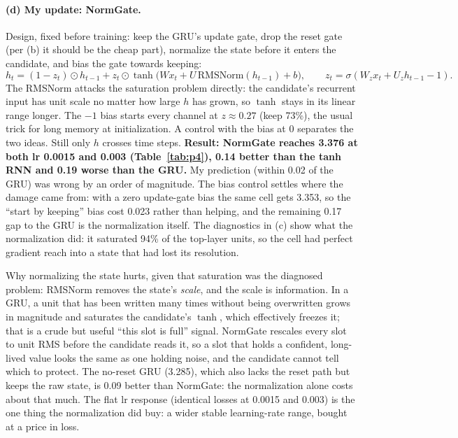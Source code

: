 \paragraph{(d) My update: NormGate.} Design, fixed before training: keep the GRU's update gate, drop the reset gate (per (b) it should be the cheap part), normalize the state before it enters the candidate, and bias the gate towards keeping:
\[ h_t = (1-z_t)\odot h_{t-1} + z_t\odot\tanh\big(W x_t + U\,\mathrm{RMSNorm}(h_{t-1}) + b\big),\qquad z_t=\sigma(W_z x_t+U_z h_{t-1} - 1). \]
The RMSNorm attacks the saturation problem directly: the candidate's recurrent input has unit scale no matter how large $h$ has grown, so $\tanh$ stays in its linear range longer. The $-1$ bias starts every channel at $z\approx 0.27$ (keep 73\%), the usual trick for long memory at initialization. A control with the bias at 0 separates the two ideas. Still only $h$ crosses time steps.
\textbf{Result: NormGate reaches 3.376 at both lr 0.0015 and 0.003 (Table~\ref{tab:p4}), 0.14 better than the tanh RNN and 0.19 worse than the GRU.} My prediction (within 0.02 of the GRU) was wrong by an order of magnitude. The bias control settles where the damage came from: with a zero update-gate bias the same cell gets 3.353, so the ``start by keeping'' bias cost 0.023 rather than helping, and the remaining 0.17 gap to the GRU is the normalization itself. The diagnostics in (c) show what the normalization did: it saturated 94\% of the top-layer units, so the cell had perfect gradient reach into a state that had lost its resolution.

Why normalizing the state hurts, given that saturation was the diagnosed problem: RMSNorm removes the state's \emph{scale}, and the scale is information. In a GRU, a unit that has been written many times without being overwritten grows in magnitude and saturates the candidate's $\tanh$, which effectively freezes it; that is a crude but useful ``this slot is full'' signal. NormGate rescales every slot to unit RMS before the candidate reads it, so a slot that holds a confident, long-lived value looks the same as one holding noise, and the candidate cannot tell which to protect. The no-reset GRU (3.285), which also lacks the reset path but keeps the raw state, is 0.09 better than NormGate: the normalization alone costs about that much. The flat lr response (identical losses at 0.0015 and 0.003) is the one thing the normalization did buy: a wider stable learning-rate range, bought at a price in loss.
